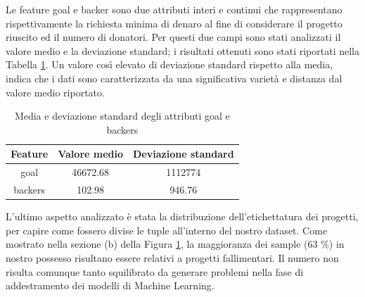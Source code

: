 Le feature goal e backer sono due attributi interi e continui che rappresentano rispettivamente la richiesta minima di denaro al fine di considerare il progetto riuscito ed il numero di donatori. Per questi due campi sono stati analizzati il valore medio e la deviazione standard; i risultati ottenuti sono stati riportati nella Tabella \ref{tab:backer}. Un valore così elevato di deviazione standard rispetto alla media, indica che i dati sono caratterizzata da una significativa varietà e distanza dal valore medio riportato.

\begin{table}
	\centering
	\caption{Media e deviazione standard degli attributi goal e backers}
	\begin{tabular}{|c|c|c|}
		\hline 
		\textbf{Feature} & \textbf{Valore medio} & \textbf{Deviazione standard} \\ 
		\hline 
		goal & 46672.68 & 1112774 \\ 
		\hline 
		backers & 102.98 & 946.76 \\ 
		\hline 
	\end{tabular} 
	\label{tab:backer}
\end{table}


L'ultimo aspetto analizzato è stata la distribuzione dell'etichettatura dei progetti, per capire come fossero divise le tuple all'interno del nostro dataset. Come mostrato nella sezione (b) della Figura \ref{fig:piestate}, la maggioranza dei sample (63 \%) in nostro possesso risultano essere relativi a progetti fallimentari. Il numero non risulta comunque tanto squilibrato da generare problemi nella fase di addestramento dei modelli di Machine Learning.

\begin{figure}%
	\centering
	\qquad
	\caption{}%
	\label{fig:piestate}%
\end{figure}

